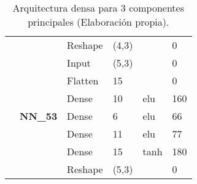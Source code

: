 \begin{table}[H]
\begin{center}
\begin{tabular}{ll|l|l|l|l|}
\multicolumn{1}{|l|}{}                                                                       &                                  & Reshape                            & (4,3)                                &                                          & 0                                           \\ \cline{2-6} 
\multicolumn{1}{|l|}{}                                                                       & \multirow{7}{*}{\textbf{NN\_53}} & Input                              & (5,3)                                &                                          & 0                                           \\ \cline{3-6} 
\multicolumn{1}{|l|}{}                                                                       &                                  & Flatten                            & 15                                   &                                          & 0                                           \\ \cline{3-6} 
\multicolumn{1}{|l|}{}                                                                       &                                  & Dense                              & 10                                   & elu                                     & 160                                         \\ \cline{3-6} 
\multicolumn{1}{|l|}{}                                                                       &                                  & Dense                              & 6                                    & elu                                     & 66                                          \\ \cline{3-6} 
\multicolumn{1}{|l|}{}                                                                       &                                  & Dense                              & 11                                   & elu                                     & 77                                          \\ \cline{3-6} 
\multicolumn{1}{|l|}{}                                                                       &                                  & Dense                              & 15                                   & tanh                                     & 180                                         \\ \cline{3-6} 
\multicolumn{1}{|l|}{}                                                                       &                                  & Reshape                            & (5,3)                                &                                          & 0                                          \\ \hline
\end{tabular}
\end{center}
\caption{Arquitectura densa para 3 componentes principales (Elaboraci\'{o}n propia).}
\label{table:nn_3}
\end{table}

